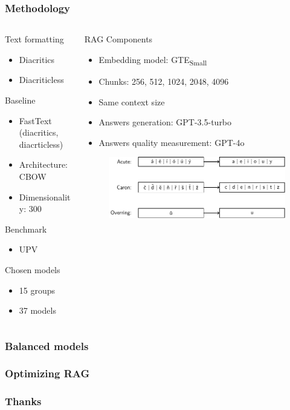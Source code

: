 \documentclass{beamer}
\begin{document}
\begin{frame}
  \frametitle{Methodology}
  \begin{columns}[onlytextwidth,T]
    \begin{column}{0.4\textwidth}
      Text formatting
      \begin{itemize}
        \item Diacritics
        \item Diacriticless
      \end{itemize}
      Baseline
      \begin{itemize}
        \item FastText (diacritics, diacrticless)
        \item Architecture: CBOW
        \item Dimensionality: 300
      \end{itemize}
      Benchmark
      \begin{itemize}
        \item UPV
      \end{itemize}
      Chosen models
      \begin{itemize}
        \item 15 groups
        \item 37 models
      \end{itemize}
    \end{column}
    \begin{column}{0.75\textwidth}
      RAG Components
      \begin{itemize}
        \item Embedding model: GTE\textsubscript{Small}
        \item Chunks: 256, 512, 1024, 2048, 4096
        \item Same context size
        \item Answers generation: GPT-3.5-turbo
        \item Answers quality measurement: GPT-4o
      \end{itemize}
      \begin{figure}
        \raggedright
        \includegraphics[scale=0.6]{src/fig/pdfs/tikz/diacritics_diacriticless.pdf}
      \end{figure}     
    \end{column}
  \end{columns}
    
  
\end{frame}

\begin{frame}
  \frametitle{Balanced models}
\end{frame}

\begin{frame}
  \frametitle{Optimizing RAG}
\end{frame}

\begin{frame}
  \frametitle{Thanks}
\end{frame}
\end{document}
